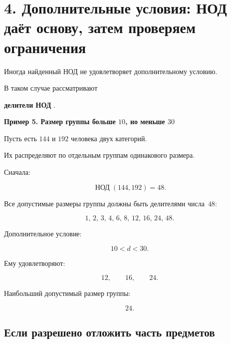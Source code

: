 \documentclass[a4paper,12pt]{article}
\newcommand{\mygcd}[2]{
  \mathop{\text{НОД}}\nolimits(#1,#2)
}
\newcommand{\term}[1]{
  \textbf{\textcolor{darkaccent}{#1}}
}
\newcommand{\exampletitle}[1]{
  \medskip
  \textbf{\textcolor{accent}{#1}}
  \par
  \smallskip
}
\begin{document}
\begin{center}

\end{center}

\clearpage


\section*{4. Дополнительные условия: НОД даёт основу, затем проверяем ограничения}

Иногда найденный НОД
не удовлетворяет дополнительному условию.

В таком случае рассматривают
\term{делители НОД}.

\exampletitle{
Пример 5. Размер группы больше $10$, но меньше $30$
}

Пусть есть $144$ и $192$ человека
двух категорий.

Их распределяют по отдельным группам
одинакового размера.

Сначала:

\[
\mygcd{144}{192}=48.
\]

Все допустимые размеры группы
должны быть делителями числа~$48$:

\[
1,\,
2,\,
3,\,
4,\,
6,\,
8,\,
12,\,
16,\,
24,\,
48.
\]

Дополнительное условие:

\[
10<d<30.
\]

Ему удовлетворяют:

\[
12,\qquad16,\qquad24.
\]

Наибольший допустимый размер группы:

\[
\boxed{24}.
\]


\subsection*{Если разрешено отложить часть предметов}
\end{document}
